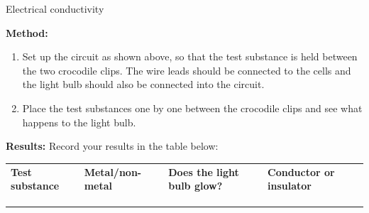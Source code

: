 \begin{i_experiment}{Electrical conductivity}
{      \label{m38706*id66251}\noindent{}\textbf{Method:}
        \newline
      \label{m38706*id66260}\begin{enumerate}[noitemsep, label=\textbf{\arabic*}. ] 
            \label{m38706*uid100}\item Set up the circuit as shown above, so that the test substance is held between the two crocodile clips. The wire leads should be connected to the cells and the light bulb should also be connected into the circuit.
\label{m38706*uid101}\item Place the test substances one by one between the crocodile clips and see what happens to the light bulb.
\end{enumerate}
        \par 
      \label{m38706*id66291}\noindent{}\textbf{Results:}
        \newline
      Record your results in the table below:
          \begin{table}[H]
        \begin{center}
      \label{m38706*id66304}
    \noindent
      \tablelasttail{}
      \begin{xtabular}[t]{|l|l|l|l|}\hline
                \textbf{Test substance}
               &
                \textbf{Metal/non-metal}
               &
                \textbf{Does the light bulb glow?}
               &
                \textbf{Conductor or insulator}
     \tabularnewline{}
         &
         &
         &
     \tabularnewline{}
         &
         &
         &
     \tabularnewline{}
         &
         &
         &
     \tabularnewline{}

\end{xtabular}
\end{center}
\end{table}}
\end{i_experiment}

